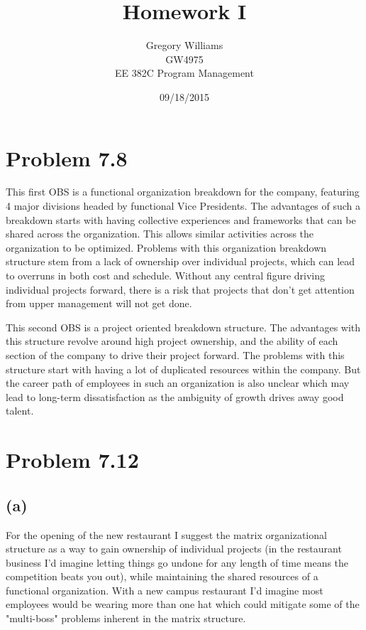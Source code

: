 \documentclass{article}
\title{Homework I}
\author{Gregory Williams\\GW4975\\EE 382C Program Management}
\date{09/18/2015}
\begin{document}
	\maketitle
	\section*{Problem 7.8}
	
	This first OBS is a functional organization breakdown for the company, featuring 4 major divisions headed by functional Vice Presidents.
	The advantages of such a breakdown starts with having collective experiences and frameworks that can be shared across the organization.  This allows similar activities across the organization to be optimized. Problems with this 	organization breakdown structure stem from a lack of ownership over individual projects, which can lead to overruns in both cost and schedule. Without any central figure driving individual projects forward, there is a risk that 		projects that don't get attention from upper management will not get done.

	\begin{center}
		
	\end{center}
	
	This second OBS is a project oriented breakdown structure. The advantages with this structure revolve around high project ownership, and the ability of each section of the company to drive their project forward. The problems with 	this structure start with having a lot of duplicated resources within the company. But the career path of employees in such an organization is also unclear which may lead to long-term dissatisfaction as the ambiguity of growth 		drives away good talent.
	
	\begin{center}
		
	\end{center}
	
	
	\section*{Problem 7.12}
	\subsection*{\quad(a)}
	For the opening of the new restaurant I suggest the matrix organizational structure as a way to gain ownership of individual projects (in the restaurant business I'd imagine letting things go undone for any length of time means the 	competition beats you out), while maintaining the shared resources of a functional organization. With a new campus restaurant I'd imagine most employees would be wearing more than one hat which could mitigate some of the 		"multi-boss" problems inherent in the matrix structure.
	\begin{center}
		
	\end{center}
\end{document}
